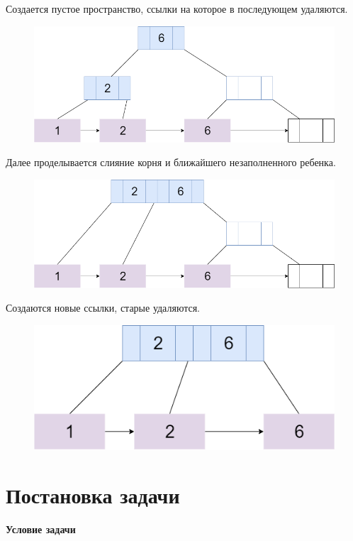 \documentclass{article}
\begin{document}
Создается пустое пространство, ссылки на которое в последующем удаляются.
\begin{figure}
\includegraphics[scale=0.4]{ddel2.png}

\caption{}
\end{figure}


Далее проделывается слияние корня и ближайшего незаполненного ребенка.
\begin{figure}
\includegraphics[scale=0.4]{ddel3.png}

\caption{}
\end{figure}


Создаются новые ссылки, старые удаляются.
\begin{figure}
\includegraphics[scale=0.4]{ddel4.png}

\caption{}
\end{figure}



 
\section{Постановка задачи}
\textbf{Условие задачи} 
\end{document}
